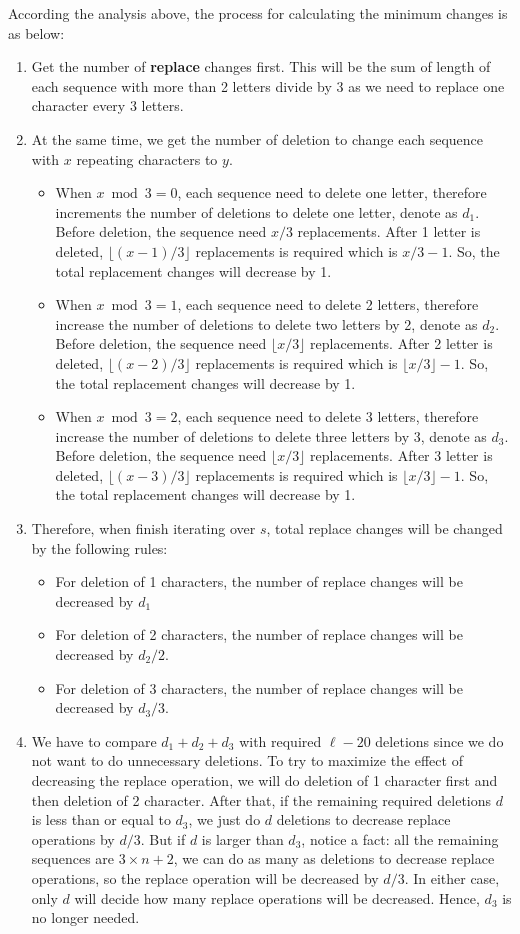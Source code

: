 According the analysis above, the process for calculating the minimum changes is as below:
\begin{enumerate}
\item Get the number of \textbf{replace} changes first. This will be the sum of length of each sequence with more than 2 letters divide by 3 as we need to replace one character every 3 letters. 
\item At the same time, we get the number of deletion to change each sequence with $x$ repeating characters to $y$. 
\begin{itemize}
\item When $x\bmod 3=0$, each sequence need to delete one letter, therefore increments the number of deletions to delete one letter, denote as $d_1$. Before deletion, the sequence need $x/3$ replacements. After 1 letter is deleted, $\lfloor(x-1)/3\rfloor$ replacements is required which is $x/3-1$. So, the total replacement changes will decrease by 1.
\item When $x\bmod 3=1$, each sequence need to delete 2 letters, therefore increase the number of deletions to delete two letters by 2, denote as $d_2$. Before deletion, the sequence need $\lfloor x/3\rfloor$ replacements. After 2 letter is deleted, $\lfloor(x-2)/3\rfloor$ replacements is required which is $\lfloor x/3\rfloor - 1$. So, the total replacement changes will decrease by 1.
\item When $x\bmod 3=2$, each sequence need to delete 3 letters, therefore increase the number of deletions to delete three letters by 3, denote as $d_3$.  Before deletion, the sequence need $\lfloor x/3\rfloor$ replacements. After 3 letter is deleted, $\lfloor(x-3)/3\rfloor$ replacements is required which is $\lfloor x/3\rfloor - 1$. So, the total replacement changes will decrease by 1.
\end{itemize}
\item Therefore, when finish iterating over $s$, total replace changes will be changed by the following rules:
\begin{itemize}
\item For deletion of 1 characters, the number of replace changes will be decreased by $d_1$
\item For deletion of 2 characters, the number of replace changes will be decreased by $d_2 / 2$.
\item For deletion of 3 characters, the number of replace changes will be decreased by $d_3 / 3$.
\end{itemize}
\item We have to compare $d_1+d_2+d_3$ with required $\ell-20$ deletions since we do not want to do unnecessary deletions. To try to maximize the effect of decreasing the replace operation, we will do deletion of 1 character first and then deletion of 2 character. After that,  if the remaining required deletions $d$ is less than or equal to $d_3$, we just do $d$ deletions to decrease replace operations by $d/3$. But if $d$ is larger than $d_3$, notice a fact: all the remaining sequences are $3\times n +2$, we can do as many as deletions to decrease replace operations, so the replace operation will be decreased by $d/3$. In either case, only $d$ will decide how many replace operations will be decreased. Hence, $d_3$ is no longer needed.

\end{enumerate}
